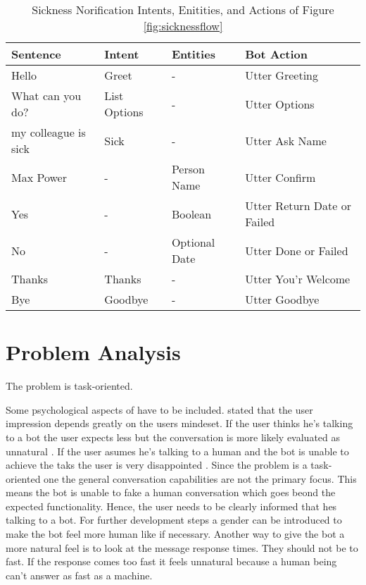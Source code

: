  \begin{table}[h]
    \centering
    \begin{tabular}{ l || l | l | l }
        Sentence & Intent & Entities & Bot Action \\ \hline \hline
        Hello & Greet & - & Utter Greeting \\ \hline
        What can you do? & List Options & - & Utter Options \\ \hline
        my colleague is sick & Sick & - & Utter Ask Name \\ \hline
        Max Power & - & Person Name & Utter Confirm \\ \hline
        Yes & - & Boolean & Utter Return Date or Failed \\ \hline
        No & - & Optional Date & Utter Done or Failed \\ \hline
        Thanks & Thanks & - & Utter You'r Welcome \\ \hline
        Bye & Goodbye & - & Utter Goodbye \\ \hline
    \end{tabular}
    \caption{Sickness Norification Intents, Enitities, and Actions of Figure \ref{fig:sicknessflow}} \label{tab:sick_data}
\end{table} \noindent

\section{Problem Analysis}
The problem is task-oriented.

Some psychological aspects of \citet{brandtzaeg2018chatbots} have to be included.
\citet{brandtzaeg2018chatbots} stated that the user impression depends greatly on the users mindeset.
If the user thinks he's talking to a bot the user expects less but the conversation is more likely 
evaluated as unnatural \cite{brandtzaeg2018chatbots}. If the user asumes he's talking to a human 
and the bot is unable to achieve the taks the user is very disappointed \cite{brandtzaeg2018chatbots}.
Since the problem is a task-oriented one the general conversation capabilities are not the primary focus.
This means the bot is unable to fake a human conversation which goes beond the expected functionality.
Hence, the user needs to be clearly informed that hes talking to a bot.
For further development steps a gender can be introduced to make the bot feel more human like if necessary.
Another way to give the bot a more natural feel is to look at the message response times.
They should not be to fast.
If the response comes too fast it feels unnatural because a human being can't answer as fast as a machine.

